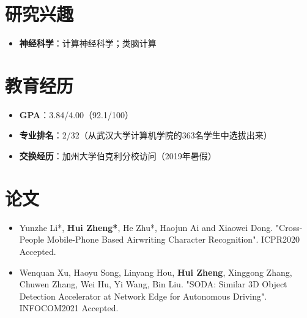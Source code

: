 \documentclass{resume}
\begin{document}
    

\section{{\bfseries 研究兴趣}}
\begin{itemize}[parsep=0.2ex]
\item \textbf{神经科学}：计算神经科学；类脑计算
\end{itemize}

\section{{\bfseries 教育经历}}
\begin{itemize}[parsep=0.1ex]
    \item \textbf{GPA}：3.84/4.00（92.1/100）
    \item \textbf{专业排名}：2/32（从武汉大学计算机学院的363名学生中选拔出来）
    \item \textbf{交换经历}：加州大学伯克利分校访问（2019年暑假）
\end{itemize}

\section{{\bfseries 论文}}
\begin{itemize}[parsep=0.2ex]
    \item Yunzhe Li*, \textbf{Hui Zheng*}, He Zhu*, Haojun Ai and Xiaowei Dong. "Cross-People Mobile-Phone Based Airwriting Character Recognition". ICPR2020 Accepted.
    \item Wenquan Xu, Haoyu Song, Linyang Hou, \textbf{Hui Zheng}, Xinggong Zhang, Chuwen Zhang, Wei Hu, Yi Wang, Bin Liu. "SODA: Similar 3D Object Detection Accelerator at Network Edge for Autonomous Driving". INFOCOM2021 Accepted.
\end{itemize}

\end{document}
